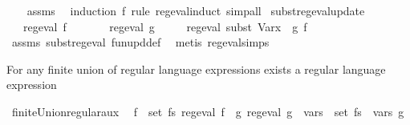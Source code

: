 \begin{isabellebody}
%
\isadelimproof
\ \ %
\endisadelimproof
%
\isatagproof
{}\isamarkupfalse%
\ assms\ \isamarkupfalse%
\ {\isacharparenleft}{\kern0pt}induction\ f\ rule{\isacharcolon}{\kern0pt}\ reg{\isacharunderscore}{\kern0pt}eval{\isachardot}{\kern0pt}induct{\isacharparenright}{\kern0pt}\ simp{\isacharunderscore}{\kern0pt}all%
\endisatagproof
{\isafoldproof}%
%
\isadelimproof
\isanewline
%
\endisadelimproof
\isanewline
\isanewline
{}\isamarkupfalse%
\ subst{\isacharunderscore}{\kern0pt}reg{\isacharunderscore}{\kern0pt}eval{\isacharunderscore}{\kern0pt}update{\isacharcolon}{\kern0pt}\isanewline
\ \ \ {\isachardoublequoteopen}reg{\isacharunderscore}{\kern0pt}eval\ f{\isachardoublequoteclose}\isanewline
\ \ \ \ \ \ \ {\isachardoublequoteopen}reg{\isacharunderscore}{\kern0pt}eval\ g{\isachardoublequoteclose}\isanewline
\ \ \ \ \ {\isachardoublequoteopen}reg{\isacharunderscore}{\kern0pt}eval\ {\isacharparenleft}{\kern0pt}subst\ {\isacharparenleft}{\kern0pt}Var{\isacharparenleft}{\kern0pt}x\ {\isacharcolon}{\kern0pt}{\isacharequal}{\kern0pt}\ g{\isacharparenright}{\kern0pt}{\isacharparenright}{\kern0pt}\ f{\isacharparenright}{\kern0pt}{\isachardoublequoteclose}\isanewline
%
\isadelimproof
\ \ %
\endisadelimproof
%
\isatagproof
{}\isamarkupfalse%
\ assms\ subst{\isacharunderscore}{\kern0pt}reg{\isacharunderscore}{\kern0pt}eval\ fun{\isacharunderscore}{\kern0pt}upd{\isacharunderscore}{\kern0pt}def\ \isamarkupfalse%
\ {\isacharparenleft}{\kern0pt}metis\ reg{\isacharunderscore}{\kern0pt}eval{\isachardot}{\kern0pt}simps{\isacharparenleft}{\kern0pt}{}{\isacharparenright}{\kern0pt}{\isacharparenright}{\kern0pt}%
\endisatagproof
{\isafoldproof}%
%
\isadelimproof
%
\endisadelimproof
%
\begin{isamarkuptext}%
For any finite union of  regular language expressions exists a  regular
language expression%
\end{isamarkuptext}\isamarkuptrue%
\isamarkupfalse%
\ finite{\isacharunderscore}{\kern0pt}Union{\isacharunderscore}{\kern0pt}regular{\isacharunderscore}{\kern0pt}aux{\isacharcolon}{\kern0pt}\isanewline
\ \ {\isachardoublequoteopen}{\isasymforall}f\ {\isasymin}\ set\ fs{\isachardot}{\kern0pt}\ reg{\isacharunderscore}{\kern0pt}eval\ f\ {\isasymLongrightarrow}\ {\isasymexists}g{\isachardot}{\kern0pt}\ reg{\isacharunderscore}{\kern0pt}eval\ g\ {\isasymand}\ {\isasymUnion}{\isacharparenleft}{\kern0pt}vars\ {\isacharbackquote}{\kern0pt}\ set\ fs{\isacharparenright}{\kern0pt}\ {\isacharequal}{\kern0pt}\ vars\ g\isanewline

\end{isabellebody}
